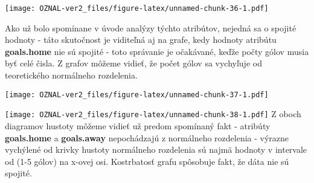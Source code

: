 \documentclass[
]{article}
\newenvironment{Shaded}{\begin{snugshade}}{\end{snugshade}}
\newcommand{\AttributeTok}[1]{\textcolor[rgb]{0.77,0.63,0.00}{#1}}
\newcommand{\ConstantTok}[1]{\textcolor[rgb]{0.00,0.00,0.00}{#1}}
\newcommand{\DecValTok}[1]{\textcolor[rgb]{0.00,0.00,0.81}{#1}}
\newcommand{\FloatTok}[1]{\textcolor[rgb]{0.00,0.00,0.81}{#1}}
\newcommand{\FunctionTok}[1]{\textcolor[rgb]{0.00,0.00,0.00}{#1}}
\newcommand{\NormalTok}[1]{#1}
\newcommand{\SpecialCharTok}[1]{\textcolor[rgb]{0.00,0.00,0.00}{#1}}
\newcommand{\StringTok}[1]{\textcolor[rgb]{0.31,0.60,0.02}{#1}}
\begin{document}
\texttt{[image: OZNAL-ver2\_files/figure-latex/unnamed-chunk-36-1.pdf]}

Ako už bolo spomínane v úvode analýzy týchto atribútov, nejedná sa o
spojité hodnoty - táto skutočnost je viditeľná aj na grafe, kedy hodnoty
atribútu \textbf{goals.home} nie sú spojité - toto správanie je
očakávané, keďže počty gólov musia byť celé čisla. Z grafov môžeme
vidieť, že počet gólov sa vychyľuje od teoretického normálneho
rozdelenia.

\begin{Shaded}
\end{Shaded}

\texttt{[image: OZNAL-ver2\_files/figure-latex/unnamed-chunk-37-1.pdf]}

\begin{Shaded}
\end{Shaded}

\texttt{[image: OZNAL-ver2\_files/figure-latex/unnamed-chunk-38-1.pdf]} Z
oboch diagramov hustoty môžeme vidieť už predom spomínaný fakt -
atribúty \textbf{goals.home} a \textbf{goals.away} nepochádzajú z
normálneho rozdelenia - výrazne vychýlené od krivky hustoty normálneho
rozdelenia sú najmä hodnoty v intervale od (1-5 gólov) na x-ovej osi.
Kostrbatosť grafu spôsobuje fakt, že dáta nie sú spojité.

\begin{Shaded}
\end{Shaded}
\end{document}
